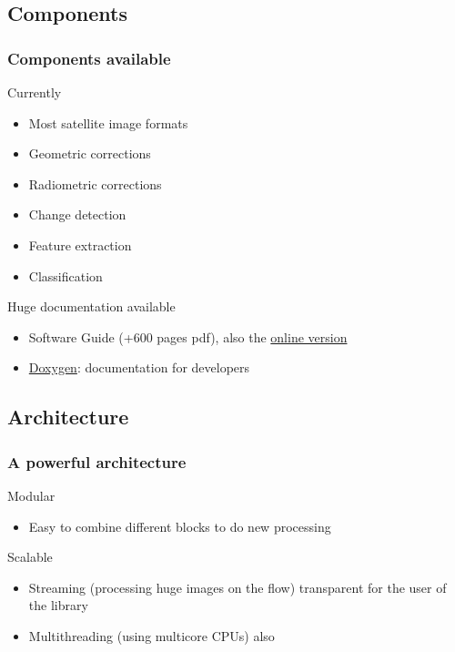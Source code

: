 \documentclass[compress]{beamer}
\begin{document}

\subsection{Components}

\begin{frame}
\frametitle{Components available}
 \begin{block}{Currently}
\scriptsize
\begin{itemize}
\item Most satellite image formats
\item Geometric corrections
\item Radiometric corrections
\item Change detection
\item Feature extraction
\item Classification
\end{itemize}
\end{block}


 \begin{block}{Huge documentation available}
\scriptsize
\begin{itemize}
\item Software Guide (+600 pages pdf), also the \href{http://www.orfeo-toolbox.org/SoftwareGuide/}{online version}
\item \href{http://www.orfeo-toolbox.org/doxygen}{Doxygen}: documentation for developers
\end{itemize}
\end{block}
\end{frame}

\subsection{Architecture}

\begin{frame}
 \frametitle{A powerful architecture}
  \begin{block}{Modular}
\scriptsize
\begin{itemize}
\item Easy to combine different blocks to do new processing
\end{itemize}
\end{block}
  \begin{block}{Scalable}
\scriptsize
\begin{itemize}
\item Streaming (processing huge images on the flow) transparent for the user of the library
\item Multithreading (using multicore CPUs) also
\end{itemize}
\end{block}
\end{frame}
\end{document}
